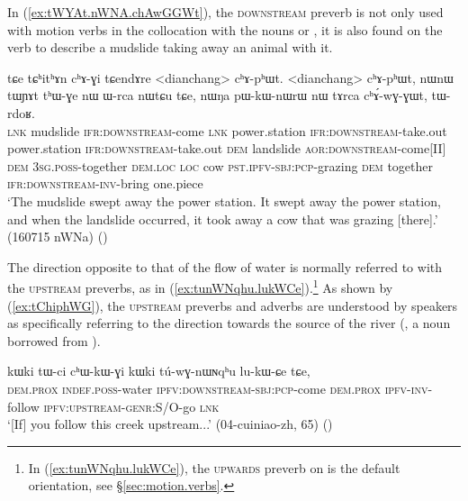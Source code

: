 In (\ref{ex:tWYAt.nWNA.chAwGGWt}), the \textsc{downstream} preverb is not only used with motion verbs in the collocation with the nouns  or , it is also found on the verb  to describe a mudslide taking away an animal with it.

 \begin{exe}
\ex \label{ex:tWYAt.nWNA.chAwGGWt}
\gll  tɕe tɕʰitʰɤn cʰɤ-ɣi tɕendɤre <dianchang> cʰɤ-pʰɯt. <dianchang> cʰɤ-pʰɯt, nɯnɯ tɯɲɤt tʰɯ-ɣe nɯ ɯ-rca nɯtɕu tɕe, 
nɯŋa pɯ-kɯ-nɯrɯ nɯ tɤrca cʰɤ́-wɣ-ɣɯt, tɯ-rdoʁ. \\
\textsc{lnk} mudslide \textsc{ifr}:\textsc{downstream}-come \textsc{lnk} power.station \textsc{ifr}:\textsc{downstream}-take.out power.station \textsc{ifr}:\textsc{downstream}-take.out \textsc{dem} landslide \textsc{aor}:\textsc{downstream}-come[II] \textsc{dem} \textsc{3sg}.\textsc{poss}-together \textsc{dem}.\textsc{loc} \textsc{loc} cow \textsc{pst}.\textsc{ipfv}-\textsc{sbj}:\textsc{pcp}-grazing \textsc{dem} together \textsc{ifr}:\textsc{downstream}-\textsc{inv}-bring one.piece \\
\glt `The mudslide swept away the power station. It swept away the power station, and when the landslide occurred, it took away a cow that was grazing [there].' (160715 nWNa)
()
\end{exe}

The direction opposite to that of the flow of water is normally referred to with the \textsc{upstream} preverbs, as in (\ref{ex:tunWNqhu.lukWCe}).\footnote{In (\ref{ex:tunWNqhu.lukWCe}), the \textsc{upwards} preverb on  is the default orientation, see §\ref{sec:motion.verbs}. } As shown by (\ref{ex:tChiphWG}), the \textsc{upstream} preverbs and adverbs are understood by speakers as specifically referring to the direction towards the source of the river (, a noun borrowed from ).

 \begin{exe}
\ex \label{ex:tunWNqhu.lukWCe}
\gll  kɯki tɯ-ci cʰɯ-kɯ-ɣi kɯki tú-wɣ-nɯɴqʰu lu-kɯ-ɕe tɕe,  \\
\textsc{dem}.\textsc{prox} \textsc{indef}.\textsc{poss}-water \textsc{ipfv}:\textsc{downstream}-\textsc{sbj}:\textsc{pcp}-come \textsc{dem}.\textsc{prox} \textsc{ipfv}-\textsc{inv}-follow \textsc{ipfv}:\textsc{upstream}-\textsc{genr}:S/O-go \textsc{lnk} \\
\glt `[If] you follow this creek upstream...' (04-cuiniao-zh, 65)
()
\end{exe}

